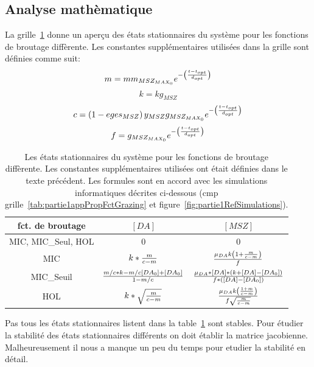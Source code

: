 {\subsection{Analyse mathèmatique}

\par{
La grille~\ref{tab:partie1etatsStat} donne un aperçu des états stationnaires du système
pour les fonctions de broutage diffèrente. Les constantes supplémentaires utilisées
dans la grille sont définies comme suit:
}
\[
m = mm_{MSZ_{MAX_0}} e ^{- \left ( {{t-t_{opt}}\over{d_{opt}}} \right )}
\]
\[
k = kg_{MSZ}
\]
\[
c = \left ( 1 - eges_{MSZ} \right ) y_{MSZ}
g_{MSZ_{MAX_0}} e ^{- \left ( {{t-t_{opt}}\over{d_{opt}}} \right )}
\]
\[
f = g_{MSZ_{MAX_0}} e ^{- \left ( {{t-t_{opt}}\over{d_{opt}}} \right )}
\]

\begin{table}[h!]
\begin{center}
\begin{tabular}{ | c | c c | }
\hline
fct. de broutage & $[DA]$ & $[MSZ]$ \\
\hline
MIC, MIC\_Seul, HOL & 0 & 0 \\
MIC & $k * {{m}\over{c-m}}$ & ${{\mu_{DA} k \left ( 1 + {{m}\over{c-m}} \right )}\over{f}}$ \\
MIC\_Seuil & ${{m/c*k-m/c[DA_0]+[DA_0]}\over{1-m/c}}$ & ${\mu_{DA} * [DA] * (k + [DA] - [DA_0])}\over{f *([DA] - [DA_0])}$ \\
HOL & $k*\sqrt{{{m}\over{c-m}}}$ & ${{\mu_{DA}k \left ( 1 + {m}\over{c-m} \right )}\over{f \sqrt{{m}\over{c-m}}}}$ \\
\hline
\end{tabular}
\end{center}
  \caption{Les états stationnaires du système pour les fonctions de broutage diffèrente. Les
constantes supplémentaires utilisées ont était définies dans le texte précédent. Les formules sont en accord
avec les simulations informatiques décrites ci-dessous (cmp grille~\ref{tab:partie1appPropFctGrazing} et
figure~\ref{fig:partie1RefSimulations}).
}
  \label{tab:partie1etatsStat}
\end{table}
\FloatBarrier

\par{
Pas tous les états stationnaires listent dans la table~\ref{tab:partie1etatsStat} sont stables. Pour
étudier la stabilité des états stationnaires différents on doit établir la matrice jacobienne.
Malheureusement il nous a manque un peu du temps pour etudier la stabilité en détail.
}

}
